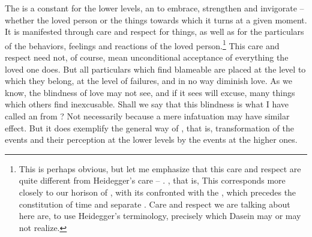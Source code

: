 \subpa
The  is a constant  for the lower
levels, an  to embrace, strengthen and invigorate --
whether the loved person or the things towards which it turns at a
given moment.  It is manifested through care and respect for things,
as well as for the particulars of the behaviors, feelings and
reactions of the loved person.\footnote{This is perhaps obvious, but
let me emphasize that this care and respect are quite different from
Heidegger's care -- .  , that is, 
This corresponds more closely to our horison of , with
its  confronted with the
, which precedes the constitution of time and separate
.  Care and respect we are talking about here are, to
use Heidegger's terminology, precisely  which
Dasein may or may not realize.} This care and respect need not, of
course, mean unconditional acceptance of everything the loved one
does.  But all particulars which  find blameable are placed at
the level to which they belong, at the level of  failures,
and in no way diminish  love.  As we know, the blindness of
love may not see, and if it sees will excuse, many things which others
find inexcusable.  Shall we say that this blindness is what I have
called an  from ? Not necessarily because a 
mere infatuation may have similar effect. But it does exemplify the 
general way of , that is, transformation of the 
 events and their perception at the lower 
levels by the  events at the higher ones.

